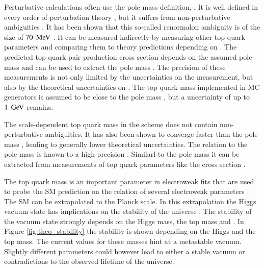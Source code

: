 Perturbative calculations often use the pole mass definition, \mtp. It is well defined in every order of perturbation theory \cite{Bigi:1994em}, but it suffers from non-perturbative ambiguities \cite{Dowling:2013baa,Beneke:1994sw}.
It has been shown that this so-called renormalon ambiguity is of the size of $70\; \,\text{Me\hspace{-.08em}V}$ \cite{Beneke:2016cbu}.
It can be measured indirectly by measuring other top quark parameters and comparing them to theory predictions depending on \mtp. The predicted top quark pair production cross section depends on the assumed pole mass and can be
used to extract the pole mass \cite{Aad:2014kva,Khachatryan:2016mqs}. The precision of these measurements is not only limited by the uncertainties on the measurement, but also by the theoretical uncertainties on \mtp.
The top quark mass implemented in MC generators is assumed to be close to the pole mass \cite{Buckley:2011ms}, but a uncertainty of up to $1\;\,\text{Ge\hspace{-.08em}V}$ remains.

The scale-dependent top quark mass in the \msbar scheme does not contain non-perturbative ambiguities. It has also been shown to converge faster than the pole mass \cite{Dowling:2013baa}, leading to generally lower theoretical
uncertainties. The relation to the pole mass is known to a high precision \cite{Marquard:2015qpa}. Similarl to the pole mass it can be extracted from measurements of top quark parameters like the \ttbar cross section \cite{Abazov:2011pta}. 

The top quark mass is an important parameter in electroweak fits that are used to probe the SM prediction on the relation of several electroweak parameters \cite{Baak:2014ora}.
The SM can be extrapolated to the Planck scale. In this extrapolation the Higgs vacuum state has implications on the stability of the universe \cite{Buttazzo:2013uya}.
The stability of the vacuum state strongly depends on the Higgs mass, the top mass and \as. In Figure \ref{fig:theo_stability} the stability is shown depending on the 
Higgs and the top mass. The current values for these masses hint at a metastable vacuum. Slightly different parameters could however lead to either a stable vacuum or contradictions
to the observed lifetime of the universe.

